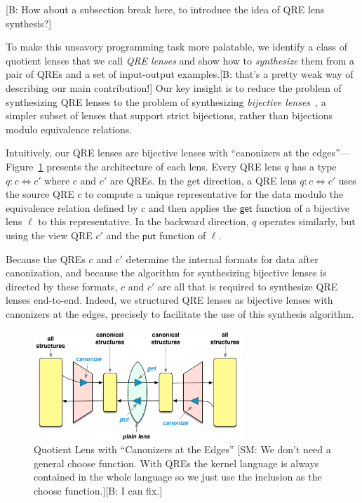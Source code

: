 \documentclass[acmsmall,review,anonymous]{acmart}
\newcommand{\FINISH}[3]{\ifdraft\textcolor{#1}{[#2: #3]}\fi}
\newcommand{\bcp}[1]{\FINISH{dkred}{B}{#1}}
\newcommand{\sam}[1]{\FINISH{dkpurple}{SM}{#1}}
\newcommand{\kw}[1]{\ensuremath{\mathsf{#1}}}
\newcommand{\get}{\ensuremath{\kw{get}}}
\newcommand{\lput}{\ensuremath{\kw{put}}}
\begin{document}
\bcp{How about a subsection break here, to introduce the idea of QRE
  lens synthesis?} 

To make this unsavory programming task more palatable, we identify a class of
quotient lenses that we call {\em QRE lenses} and show how to {\em synthesize}
them from a pair of QREs and a set of input-output examples.\bcp{that's a pretty weak
  way of describing our main contribution!} Our key
insight is to reduce the problem of synthesizing QRE lenses to the problem of
synthesizing {\em bijective lenses}~\cite{optician}, a simpler subset of
lenses that support strict bijections, rather than bijections modulo
equivalence relations.

Intuitively, our QRE lenses are bijective lenses with ``canonizers at the
edges''---Figure~\ref{fig:attheedges} presents the architecture of each lens.
Every QRE lens $q$ has a type $q: c \Leftrightarrow c'$ where $c$ and $c'$ are QREs.
In the get direction, a QRE lens $q: c \Leftrightarrow c'$ uses the source
QRE $c$ to compute a unique representative for the data modulo the equivalence
relation defined by $c$ and then applies the $\get$ function of a bijective
lens $\ell$ to this representative. In the backward direction, $q$ operates
similarly,  but using the view QRE $c'$ and the $\lput$ function of $\ell$.

Because the QREs $c$ and $c'$ determine the internal formats for data after
canonization, and because the algorithm for synthesizing bijective lenses is
directed by these formats, $c$ and $c'$ are all that is required to synthesize
QRE lenses end-to-end.  Indeed, we structured QRE lenses as bijective lenses with
canonizers at the edges, precisely to facilitate the use of this synthesis algorithm.

\begin{figure}[t]
\centering
\includegraphics[width=0.7\textwidth]{canonizers-outside}
\caption{Quotient Lens with ``Canonizers at the Edges''
\sam{We don't need a general choose function. With QREs the kernel language is
always contained in the whole language so we just use the inclusion as the
choose function.}\bcp{I can fix.}}
\label{fig:attheedges}
\end{figure}
\end{document}
